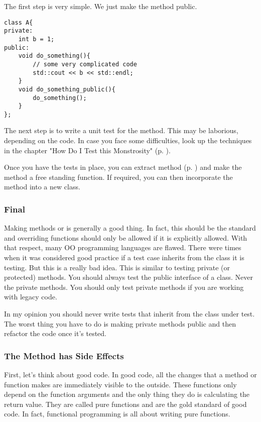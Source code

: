 The first step is very simple. We just make the method public.

\begin{programcode}{}
\begin{verbatim}
class A{
private:
    int b = 1;
public:
    void do_something(){
        // some very complicated code
        std::cout << b << std::endl;
    }
    void do_something_public(){
        do_something();
    }
};
\end{verbatim}
\end{programcode}

The next step is to write a unit test for the method. This may be laborious, depending on the code. In case you face some difficulties, look up the techniques in the chapter "How Do I Test this Monstrosity" (p. \pageref{chap:how_do_i_test_this_monstrosity}).

Once you have the tests in place, you can extract method (p. \pageref{sec:extract_method}) and make the method a free standing function. If required, you can then incorporate the method into a new class.

\subsubsection*{Final}

Making methods  or  is generally a good thing. In fact, this should be the standard and overriding functions should only be allowed if it is explicitly allowed. With that respect, many OO programming languages are flawed. There were times when it was considered good practice if a test case inherits from the class it is testing. But this is a really bad idea. This is similar to testing private (or protected) methods. You should always test the public interface of a class. Never the private methods. You should only test private methods if you are working with legacy code.

In my opinion you should never write tests that inherit from the class under test. The worst thing you have to do is making private methods public and then refactor the code once it's tested.

\subsubsection*{The Method has Side Effects}

First, let's think about good code. In good code, all the changes that a method or function makes are immediately visible to the outside. These functions only depend on the function arguments and the only thing they do is calculating the return value. They are called pure functions and are the gold standard of good code. In fact, functional programming is all about writing pure functions.

